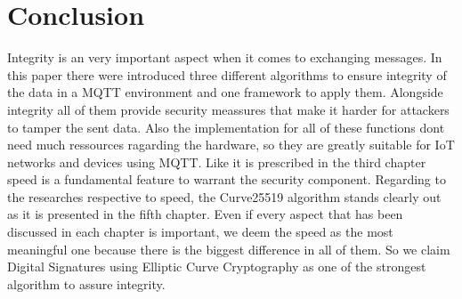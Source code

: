 \section{Conclusion}

Integrity is an very important aspect when it comes to exchanging messages. In this paper there were introduced three different algorithms to ensure integrity of the data in a MQTT environment and one framework to apply them. Alongside integrity all of them provide security meassures that make it harder for attackers to tamper the sent data. Also the implementation for all of these functions dont need much ressources ragarding the hardware, so they are greatly suitable for IoT networks and devices using MQTT. Like it is prescribed in the third chapter speed is a fundamental feature to warrant the security component. Regarding to the researches respective to speed, the Curve25519 algorithm stands clearly out as it is presented in the fifth chapter. Even if every aspect that has been discussed in each chapter is important, we deem the speed as the most meaningful one because there is the biggest difference in all of them. So we claim Digital Signatures using Elliptic Curve Cryptography as one of the strongest algorithm to assure integrity.
